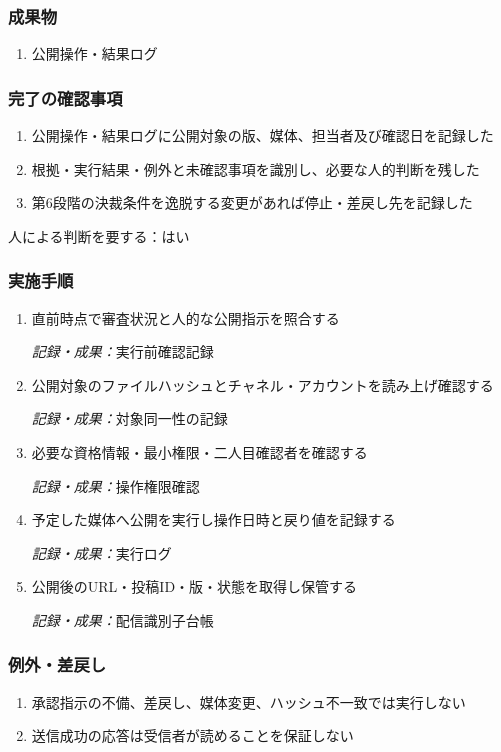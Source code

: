 \documentclass[a4paper,11pt]{article}
\begin{document}
\subsubsection*{成果物}
\begin{enumerate}[leftmargin=2em,itemsep=0.35em]
\item 公開操作・結果ログ
\end{enumerate}
\subsubsection*{完了の確認事項}
\begin{enumerate}[leftmargin=2em,itemsep=0.35em]
\item 公開操作・結果ログに公開対象の版、媒体、担当者及び確認日を記録した
\item 根拠・実行結果・例外と未確認事項を識別し、必要な人的判断を残した
\item 第6段階の決裁条件を逸脱する変更があれば停止・差戻し先を記録した
\end{enumerate}
\par 人による判断を要する：はい\par\medskip
\subsubsection*{実施手順}
\begin{enumerate}[leftmargin=2em,itemsep=0.65em]
\item 直前時点で審査状況と人的な公開指示を照合する\par\noindent\textit{記録・成果：}実行前確認記録\nobreak\smallskip
\item 公開対象のファイルハッシュとチャネル・アカウントを読み上げ確認する\par\noindent\textit{記録・成果：}対象同一性の記録\nobreak\smallskip
\item 必要な資格情報・最小権限・二人目確認者を確認する\par\noindent\textit{記録・成果：}操作権限確認\nobreak\smallskip
\item 予定した媒体へ公開を実行し操作日時と戻り値を記録する\par\noindent\textit{記録・成果：}実行ログ\nobreak\smallskip
\item 公開後のURL・投稿ID・版・状態を取得し保管する\par\noindent\textit{記録・成果：}配信識別子台帳\nobreak\smallskip
\end{enumerate}
\subsubsection*{例外・差戻し}
\begin{enumerate}[leftmargin=2em,itemsep=0.35em]
\item 承認指示の不備、差戻し、媒体変更、ハッシュ不一致では実行しない
\item 送信成功の応答は受信者が読めることを保証しない
\end{enumerate}
\end{document}
